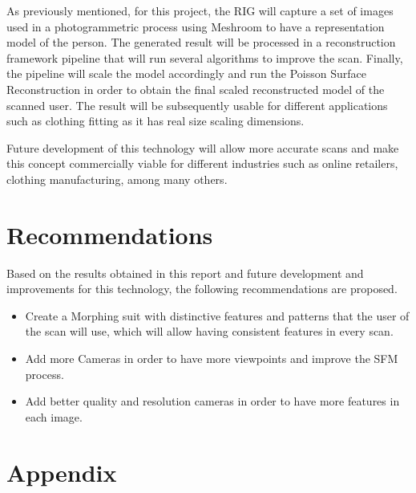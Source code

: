 \documentclass[12pt]{report}
\begin{document}
As previously mentioned, for this project, the RIG will capture a set of images used in a photogrammetric process using Meshroom to have a representation model of the person. 
The generated result will be processed in a reconstruction framework pipeline that will run several algorithms to improve the scan. 
Finally, the pipeline will scale the model accordingly and run the Poisson Surface Reconstruction in order to obtain the final scaled reconstructed model of the scanned user. 
The result will be subsequently usable for different applications such as clothing fitting as it has real size scaling dimensions. 

Future development of this technology will allow more accurate scans and make this concept commercially viable for different industries such as online retailers, clothing manufacturing, among many others.


\chapter{Recommendations}

Based on the results obtained in this report and future development and improvements for this technology, the following recommendations are proposed.

\begin{itemize}
  \item Create a Morphing suit with distinctive features and patterns that the user of the scan will use, which will allow having consistent features in every scan.
  \item Add more Cameras in order to have more viewpoints and improve the SFM process.
  \item Add better quality and resolution cameras in order to have more features in each image.
\end{itemize}




\nocite{*}   %




\appendix
\chapter{Appendix}
\end{document}
